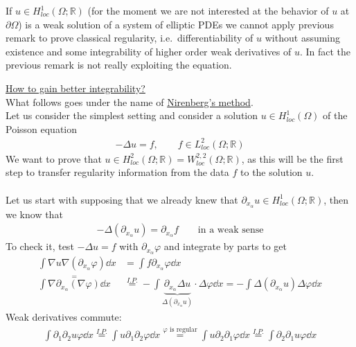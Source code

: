 If \( u \in  H_{loc}^{1} (\Omega; \mathbb{R})  \) (for the moment we are not interested at the behavior of \( u \) at \( \partial \Omega \)) is a weak solution of a system of elliptic PDEs we cannot apply previous remark to prove classical regularity, i.e.\ differentiability of \( u \) without assuming existence and some integrability of higher order weak derivatives of \( u \). In fact the previous remark is not really exploiting the equation.\\
\par
\underline{How to gain better integrability?}\\
What   follows goes under the name of \underline{Nirenberg's method}.\\
Let us consider the simplest setting and consider a solution \( u \in H_{loc}^{1} (\Omega)  \) of the Poisson equation
\begin{gather}
	- \Delta u = f, \qquad f \in L_{loc}^{2} (\Omega ;\mathbb{R})
\end{gather}
We want to prove that \( u \in H_{loc}^{2} (\Omega ; \mathbb{R}) =W_{loc}^{2,2} (\Omega ;\mathbb{R})  \), as this will be the first step to transfer regularity information from the data \( f \) to the solution \( u \).\\
\\
Let us start with supposing that we already knew that \( \partial_{x_{\alpha }} u \in H_{loc}^{1} (\Omega ;\mathbb{R})  \), then we know that
\begin{gather}
	-\Delta (\partial_{x_{\alpha }} u) = \partial_{x_{\alpha }} f \qquad \text{in a weak sense}
\end{gather}
To check it, test \( -\Delta u=f \) with \( \partial_{x_{\alpha }} \varphi  \) and integrate by parts to get
\begin{align}
	\int \nabla u \nabla (\partial_{x_{\alpha }}\varphi )  \dd{x}           & = \int f \partial_{x_{\alpha }}\varphi  \dd{x}  \\
	\overset{=}{\int \nabla \partial_{x_{\alpha }}(\nabla \varphi)  \dd{x}} & \overset{I.P.}{=} - \int \underbrace{\partial_{x_{\alpha }} \Delta u}_{\Delta (\partial_{x_{\alpha }} u) } \cdot \Delta \varphi \dd{x} = - \int \Delta (\partial_{x_{\alpha }}u) \Delta \varphi  \dd{x}
\end{align}
Weak derivatives commute:
\begin{gather}
	\int \partial_{1}\partial_{2} u \varphi  \dd{x} \overset{I.P.}{=} \int u \partial_{1} \partial_{2} \varphi  \dd{x} \overset{\varphi \text{ is regular}}{=} \int u \partial_{2}\partial_{1} \varphi \dd{x} \overset{I.P.}{=} \int \partial_{2}\partial_{1}u \varphi \dd{x}
\end{gather}
